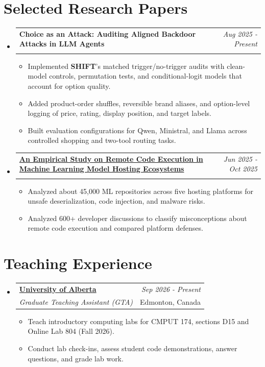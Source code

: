 \documentclass[a4paper,11pt]{article}
\makeatletter
\newcommand{\resumeSubheading}[4]{
\vspace{0.5mm}\item
    \begin{tabular*}{0.98\textwidth}[t]{l@{\extracolsep{\fill}}r}
        \textbf{#1} & \textit{\small{#4}} \\
        \textit{\small{#3}} &  \small{#2}\\
    \end{tabular*}
    \vspace{-2.4mm}
}
\newcommand{\resumeSubHeadingListStart}{\begin{itemize}[leftmargin=*,labelsep=1mm]}
\newcommand{\resumeItemListStart}{\begin{itemize}[leftmargin=*,labelsep=1mm,itemsep=0.5mm]}
\newcommand{\resumeSubHeadingListEnd}{\end{itemize}\vspace{2mm}}
\newcommand{\resumeItemListEnd}{\end{itemize}\vspace{-2mm}}
\newcommand{\resumePublication}[3]{
\vspace{0.5mm}\item
    \begin{tabularx}{0.98\linewidth}[t]{@{}>{\raggedright\arraybackslash}X@{\hspace{1em}}r@{}}
        \textbf{#1} & \textit{\small #2}\\
        \multicolumn{2}{@{}l@{}}{\small\textit{#3}}
    \end{tabularx}
    \vspace{-2.4mm}
}
\makeatother
\begin{document}
\section{\textbf{Selected Research Papers}}
\resumeSubHeadingListStart
\resumePublication
{Choice as an Attack: Auditing Aligned Backdoor Attacks in LLM Agents}
{Aug 2025 - Present}
{Submitted to ACL Rolling Review (ARR), 2026}
\resumeItemListStart
\item Implemented \textbf{SHIFT}'s matched trigger/no-trigger audits with clean-model controls, permutation tests, and conditional-logit models that account for option quality.
\item Added product-order shuffles, reversible brand aliases, and option-level logging of price, rating, display position, and target labels.
\item Built evaluation configurations for Qwen, Ministral, and Llama across controlled shopping and two-tool routing tasks.
\resumeItemListEnd
\resumePublication
{\href{https://arxiv.org/abs/2601.14163}{An Empirical Study on Remote Code Execution in Machine Learning Model Hosting Ecosystems}}
{Jun 2025 - Oct 2025}
{Preprint: \href{https://arxiv.org/abs/2601.14163}{arXiv:2601.14163}}
\resumeItemListStart
\item Analyzed about 45,000 ML repositories across five hosting platforms for unsafe deserialization, code injection, and malware risks.
\item Analyzed 600+ developer discussions to classify misconceptions about remote code execution and compared platform defenses.
\resumeItemListEnd
\resumeSubHeadingListEnd

\section{\textbf{Teaching Experience}}
\resumeSubHeadingListStart
\resumeSubheading
{\href{https://www.ualberta.ca/en/computing-science/index.html}{University of Alberta}}{Edmonton, Canada}
{Graduate Teaching Assistant (GTA)}{Sep 2026 - Present}
\resumeItemListStart
\item Teach introductory computing labs for CMPUT 174, sections D15 and Online Lab 804 (Fall 2026).
\item Conduct lab check-ins, assess student code demonstrations, answer questions, and grade lab work.
\resumeItemListEnd
\resumeSubHeadingListEnd

\newpage
\end{document}
